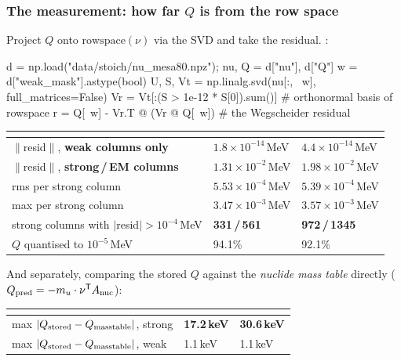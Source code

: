 \subsubsection{The measurement: how far \texorpdfstring{$Q$}{Q} is from the row
               space}
\label{sec:wegscheider-measurement}

Project $Q$ onto $\mathrm{rowspace}(\nu)$ via the SVD and take the residual.
\derivedhere:

\begin{srclisting}
d = np.load("data/stoich/nu_mesa80.npz"); nu, Q = d["nu"], d["Q"]
w = d["weak_mask"].astype(bool)
U, S, Vt = np.linalg.svd(nu[:, ~w], full_matrices=False)
Vr = Vt[:(S > 1e-12 * S[0]).sum()]              # orthonormal basis of rowspace
r  = Q[~w] - Vr.T @ (Vr @ Q[~w])                # the Wegscheider residual
\end{srclisting}

\begin{center}
\begin{tabularx}{\textwidth}{@{}Y L{3.0cm} L{3.0cm}@{}}
\toprule
 & \textbf{} & \textbf{} \\
\midrule
$\|$resid$\|$, \textbf{weak columns only} & $1.8\times10^{-14}$\,MeV &
  $4.4\times10^{-14}$\,MeV \\
$\|$resid$\|$, \textbf{strong\,/\,EM columns} & $1.31\times10^{-2}$\,MeV &
  $1.98\times10^{-2}$\,MeV \\
rms per strong column & $5.53\times10^{-4}$\,MeV &
  $5.39\times10^{-4}$\,MeV \\
max per strong column & $3.47\times10^{-3}$\,MeV &
  $3.57\times10^{-3}$\,MeV \\
strong columns with $|$resid$| > 10^{-4}$\,MeV & \textbf{331\,/\,561} &
  \textbf{972\,/\,1345} \\
$Q$ quantised to $10^{-5}$\,MeV & 94.1\% & 92.1\% \\
\bottomrule
\end{tabularx}
\end{center}

And separately, comparing the stored $Q$ against the \emph{nuclide mass table}
directly ($Q_{\rm pred} = -m_u\cdot\nu^{\mathsf{T}} A_{\rm nuc}$):

\begin{center}
\begin{tabularx}{\textwidth}{@{}Y L{3.0cm} L{3.0cm}@{}}
\toprule
 & \textbf{} & \textbf{} \\
\midrule
max $|Q_{\rm stored} - Q_{\rm masstable}|$, strong & \textbf{17.2\,keV} &
  \textbf{30.6\,keV} \\
max $|Q_{\rm stored} - Q_{\rm masstable}|$, weak & 1.1\,keV & 1.1\,keV \\
\bottomrule
\end{tabularx}
\end{center}

